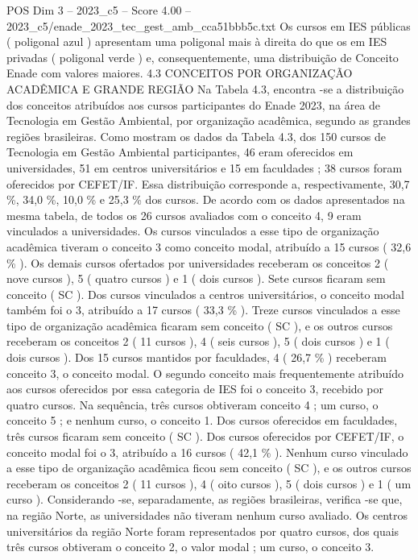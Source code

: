 \begin{textsample}{POS Dim 3 – 2023\_c5 – Score 4.00 – 2023\_c5/enade\_2023\_tec\_gest\_amb\_cca51bbb5c.txt}
Os cursos em IES públicas ( poligonal azul ) apresentam uma poligonal mais à direita do que os em IES privadas ( poligonal verde ) e, consequentemente, uma distribuição de Conceito Enade com valores maiores. 4.3 CONCEITOS POR ORGANIZAÇÃO ACADÊMICA E GRANDE REGIÃO Na Tabela 4.3, encontra -se a distribuição dos conceitos atribuídos aos cursos participantes do Enade 2023, na área de Tecnologia em Gestão Ambiental, por organização acadêmica, segundo as grandes regiões brasileiras.
Como mostram os dados da Tabela 4.3, dos 150 cursos de Tecnologia em Gestão Ambiental participantes, 46 eram oferecidos em universidades, 51 em centros universitários e 15 em faculdades ; 38 cursos foram oferecidos por CEFET/IF.
Essa distribuição corresponde a, respectivamente, 30,7 \%, 34,0 \%, 10,0 \% e 25,3 \% dos cursos.
De acordo com os dados apresentados na mesma tabela, de todos os 26 cursos avaliados com o conceito 4, 9 eram vinculados a universidades.
Os cursos vinculados a esse tipo de organização acadêmica tiveram o conceito 3 como conceito modal, atribuído a 15 cursos ( 32,6 \% ).
Os demais cursos ofertados por universidades receberam os conceitos 2 ( nove cursos ), 5 ( quatro cursos ) e 1 ( dois cursos ).
Sete cursos ficaram sem conceito ( SC ).
Dos cursos vinculados a centros universitários, o conceito modal também foi o 3, atribuído a 17 cursos ( 33,3 \% ).
Treze cursos vinculados a esse tipo de organização acadêmica ficaram sem conceito ( SC ), e os outros cursos receberam os conceitos 2 ( 11 cursos ), 4 ( seis cursos ), 5 ( dois cursos ) e 1 ( dois cursos ).
Dos 15 cursos mantidos por faculdades, 4 ( 26,7 \% ) receberam conceito 3, o conceito modal.
O segundo conceito mais frequentemente atribuído aos cursos oferecidos por essa categoria de IES foi o conceito 3, recebido por quatro cursos.
Na sequência, três cursos obtiveram conceito 4 ; um curso, o conceito 5 ; e nenhum curso, o conceito 1.
Dos cursos oferecidos em faculdades, três cursos ficaram sem conceito ( SC ).
Dos cursos oferecidos por CEFET/IF, o conceito modal foi o 3, atribuído a 16 cursos ( 42,1 \% ).
Nenhum curso vinculado a esse tipo de organização acadêmica ficou sem conceito ( SC ), e os outros cursos receberam os conceitos 2 ( 11 cursos ), 4 ( oito cursos ), 5 ( dois cursos ) e 1 ( um curso ).
Considerando -se, separadamente, as regiões brasileiras, verifica -se que, na região Norte, as universidades não tiveram nenhum curso avaliado.
Os centros universitários da região Norte foram representados por quatro cursos, dos quais três cursos obtiveram o conceito 2, o valor modal ; um curso, o conceito 3.

\end{textsample}
